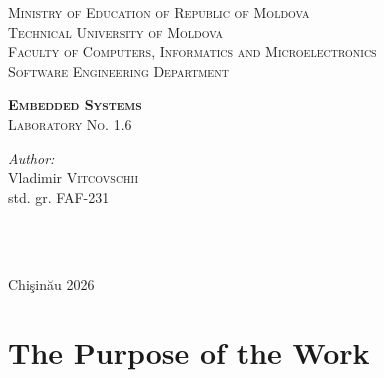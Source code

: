 \documentclass[12pt]{article}
\begin{document}
\begin{titlepage}
   \begin{center}
    \textsc{\large Ministry of Education of Republic of Moldova}\\[0.5cm]
    \textsc{\large Technical University of Moldova}\\[0.5cm]
    \textsc{\large Faculty of Computers, Informatics and Microelectronics}\\[0.5cm]
    \textsc{\large Software Engineering Department}\\[1.2cm]

    \vspace{25mm}

    {\LARGE \textbf{\textsc{Embedded Systems}}}\\[0.5cm]
    \textsc{\large Laboratory No. 1.6}\\[0.5cm]

    \newcommand{\HRule}{\rule{\linewidth}{0.5mm}}
    \vspace{80mm}

    \begin{minipage}[t]{0.4\textwidth}
    \begin{flushleft} \large
    \emph{Author:} \\
    Vladimir \textsc{Vitcovschii}\\
    std. gr. FAF-231
    \end{flushleft}
    \end{minipage}
    ~
    \begin{minipage}[t]{0.4\textwidth}
    \begin{flushright} \large
    \end{flushright}
    \end{minipage}\\[3cm]

    \vspace{5mm}
    \large Chi\c{s}in\u{a}u 2026\\[0.5cm]

    \vfill
    \end{center}
\end{titlepage}

\clearpage
\tableofcontents
\clearpage

\setcounter{page}{2}
\pagestyle{fancy}
\fancyhf{}
\rhead{\thepage}

\section{The Purpose of the Work}
\end{document}
